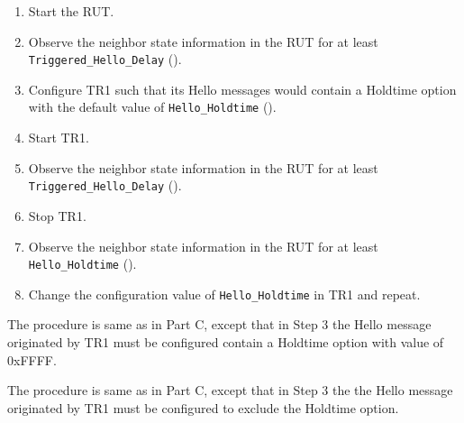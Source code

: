 \documentclass[11pt]{report}
\begin{document}

\begin{enumerate}

  \item Start the RUT.

  \item Observe the neighbor state information in the RUT for at least
        \verb=Triggered_Hello_Delay= ({\PimsmTriggeredHelloDelay}).

  \item Configure TR1 such that its Hello messages would contain a Holdtime
        option with the default value of \verb=Hello_Holdtime=
        ({\PimsmHelloHoldtime}).

  \item Start TR1.

  \item Observe the neighbor state information in the RUT for at least
        \verb=Triggered_Hello_Delay= ({\PimsmTriggeredHelloDelay}).

  \item Stop TR1.

  \item Observe the neighbor state information in the RUT for at least
        \verb=Hello_Holdtime= ({\PimsmHelloHoldtime}).

  \item Change the configuration value of \verb=Hello_Holdtime= in TR1 and
        repeat.

\end{enumerate}


The procedure is same as in Part C, except that in Step 3 the Hello message
originated by TR1 must be configured contain a Holdtime option with value of
0xFFFF.


The procedure is same as in Part C, except that in Step 3 the the Hello message
originated by TR1 must be configured to exclude the Holdtime option.


\end{document}
